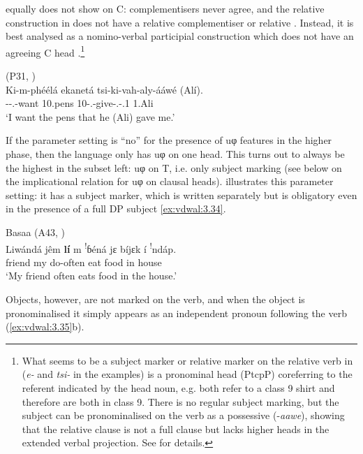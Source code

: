\documentclass[output=paper]{langsci/langscibook}
\begin{document}
 equally does not show  on C: complementisers never agree, and
the relative construction in  does not have a relative complementiser or
relative . Instead, it is best analysed as a nomino-verbal participial
construction which does not have an agreeing C head
\citep{vanderWal2010}.\footnote{What seems to be a subject marker or
relative marker on the relative verb in  (\emph{e-} and \emph{tsi-} in
the examples) is a pronominal head (PtcpP) coreferring to the referent
indicated by the head noun, e.g. both refer to a class 9 shirt and therefore
are both in class 9. There is no regular subject marking, but the subject can
be pronominalised on the verb as a possessive (-\emph{aawe}), showing that the
relative clause is not a full clause but lacks higher heads in the extended
verbal projection. See \textcite{vanderWal2010} for details.}

\ea {} (P31, \citealt[210]{vanderWal2010})\\
    \gll Ki-m-phéélá  ekanetá  tsi-ki-vah-aly-ááwé  (Alí).\\
        \Fsg-\Sm-\Prs.\Cj-want  10.pens  10-\Fsg.\Om{}-give-\Pfv.\Rel{}-\Poss{}.1  1.Ali\\
    \glt    ‘I want the pens that he (Ali) gave me.’
\z

If the parameter setting is \enquote{no} for the presence of uφ features in the higher
phase, then the language only has uφ on one head. This turns out to always be
the highest in the subset left: uφ on T, i.e. only subject marking (see
 below on the implicational relation for uφ on clausal heads).
 illustrates this parameter setting: it has a subject marker, which is
written separately but is obligatory even in the presence of a full DP subject
\eqref{ex:vdwal:3.34}.

\ea\label{ex:vdwal:3.34}Basaa (A43, \citealt[277]{Hyman2003}) \label{bkm:Ref347562219}\\
    \gll    Liwándá  jêm  \textbf{lí}  m  \textsuperscript{!}ɓéná  jɛ  bíjɛk  í  \textsuperscript{!}ndáp.\\
        friend  my  \Sm{}  \Prs{}  do-often  eat  food  in  house\\
    \glt    ‘My friend often eats food in the house.’
\z

Objects, however, are not marked on the verb, and when the object is
pronominalised it simply appears as an independent pronoun following the verb
(\ref{ex:vdwal:3.35}b).
\end{document}
